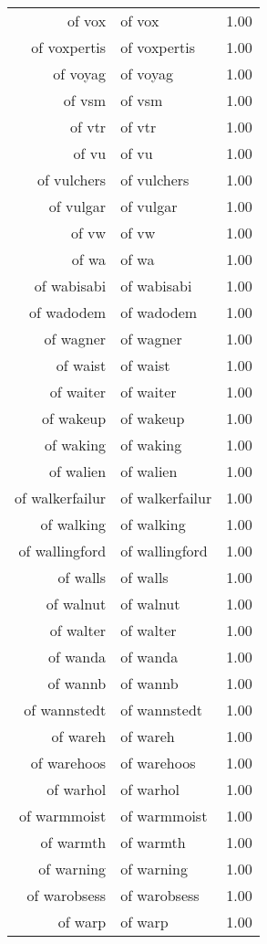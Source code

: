 \begin{table}[ht]
\begin{tabular}{rlr}
  of vox & of vox & 1.00 \\ 
  of voxpertis & of voxpertis & 1.00 \\ 
  of voyag & of voyag & 1.00 \\ 
  of vsm & of vsm & 1.00 \\ 
  of vtr & of vtr & 1.00 \\ 
  of vu & of vu & 1.00 \\ 
  of vulchers & of vulchers & 1.00 \\ 
  of vulgar & of vulgar & 1.00 \\ 
  of vw & of vw & 1.00 \\ 
  of wa & of wa & 1.00 \\ 
  of wabisabi & of wabisabi & 1.00 \\ 
  of wadodem & of wadodem & 1.00 \\ 
  of wagner & of wagner & 1.00 \\ 
  of waist & of waist & 1.00 \\ 
  of waiter & of waiter & 1.00 \\ 
  of wakeup & of wakeup & 1.00 \\ 
  of waking & of waking & 1.00 \\ 
  of walien & of walien & 1.00 \\ 
  of walkerfailur & of walkerfailur & 1.00 \\ 
  of walking & of walking & 1.00 \\ 
  of wallingford & of wallingford & 1.00 \\ 
  of walls & of walls & 1.00 \\ 
  of walnut & of walnut & 1.00 \\ 
  of walter & of walter & 1.00 \\ 
  of wanda & of wanda & 1.00 \\ 
  of wannb & of wannb & 1.00 \\ 
  of wannstedt & of wannstedt & 1.00 \\ 
  of wareh & of wareh & 1.00 \\ 
  of warehoos & of warehoos & 1.00 \\ 
  of warhol & of warhol & 1.00 \\ 
  of warmmoist & of warmmoist & 1.00 \\ 
  of warmth & of warmth & 1.00 \\ 
  of warning & of warning & 1.00 \\ 
  of warobsess & of warobsess & 1.00 \\ 
  of warp & of warp & 1.00 \\ 

\end{tabular}
\end{table}

